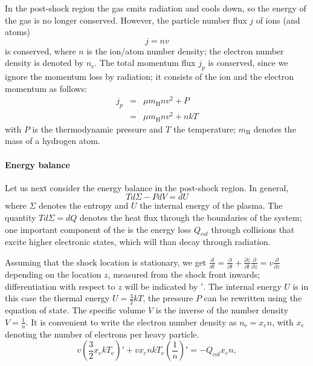 In the post-shock region the gas emits radiation and cools down, so the energy of the gas is no longer conserved.  However, the particle number flux $j$ of ions (and atoms) 
\begin{equation}j=nv\label{j_n}\end{equation}
is conserved, where $n$ is the ion/atom number density; the electron number density is denoted by $n_{\mathrm{e}}$. The total momentum flux $j_p$ is conserved, since we ignore the momentum loss by radiation; it consists of the ion and the electron momentum as follows:
\begin{eqnarray}  
j_p&=&\mu m_{\mathrm{H}} n v^2+P \nonumber \\
   &=&\mu m_{\mathrm{H}} n v^2+nkT \label{j_p}
\end{eqnarray}
with $P$ is the thermodynamic pressure and $T$ the temperature; $m_{\mathrm{H}}$ denotes the mass of a hydrogen atom.

\paragraph{Energy balance}
\label{sect:energybalance}

Let us next consider the energy balance in the post-shock region. In general,  
\begin{equation} \label{tsminuspdvisdu} T d\Sigma -P dV=dU \end{equation}
where $\Sigma$ denotes the entropy and $U$ the internal energy of the plasma. The quantity $T d\Sigma=dQ$ denotes the heat flux through the boundaries of the system; one important component of the is the energy loss $Q_{col}$ through collisions that excite higher electronic states, which will than decay through radiation. 

Assuming that the shock location is stationary, we get $\frac{d}{dt}=\frac{\partial}{\partial t}+\frac{\partial z}{\partial t}\frac{\partial}{\partial z}=v\frac{\partial}{\partial z}$ depending on the location $z$, measured from the shock front inwards; differentiation with respect to $z$ will be indicated by $'$.
The internal energy $U$ is in this case the thermal energy $U=\frac{3}{2}kT$, the pressure $P$ can be rewritten using the equation of state. The specific volume $V$ is the inverse of the number density $V=\frac{1}{n}$. 
It is convenient to write the electron number density as \mbox{$n_{\mathrm{e}}=x_e n$,} with $x_e$ denoting the number of electrons per heavy particle.
\begin{equation}
\label{energyelec}
v\left(\frac{3}{2}x_e k T_{\mathrm{e}}\right)'+v x_e n k T_{\mathrm{e}} \left(\frac{1}{n}\right)'=-Q_{col} x_e n,
\end{equation} 

